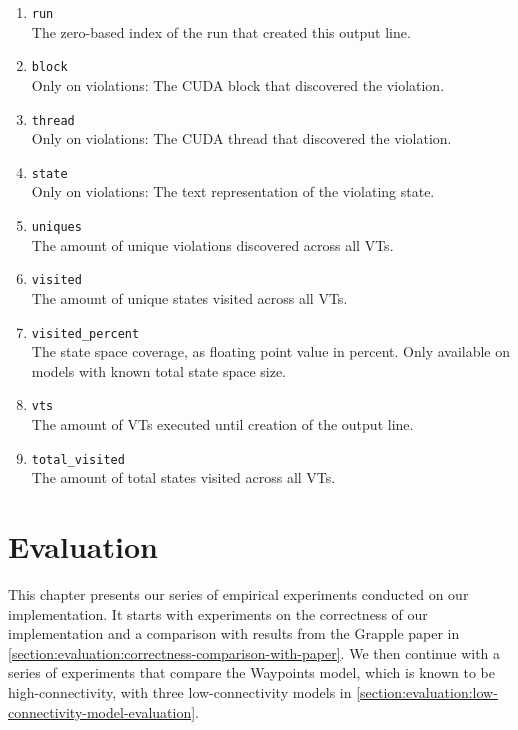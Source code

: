 \documentclass[
fancyheadings, %
%
%
]{stsreprt}
\begin{document}
\begin{enumerate}
    \item \texttt{run} \\
          The zero-based index of the run that created this output line.
    \item \texttt{block} \\
          Only on violations:
          The CUDA block that discovered the violation.
    \item \texttt{thread} \\
          Only on violations:
          The CUDA thread that discovered the violation.
    \item \texttt{state} \\
          Only on violations:
          The text representation of the violating state.
    \item \texttt{uniques} \\
          The amount of unique violations discovered across all VTs.
    \item \texttt{visited} \\
          The amount of unique states visited across all VTs.
    \item \texttt{visited\_percent} \\
          The state space coverage, as floating point value in percent.
          Only available on models with known total state space size.
    \item \texttt{vts} \\
          The amount of VTs executed until creation of the output line.
    \item \texttt{total\_visited} \\
          The amount of total states visited across all VTs.
\end{enumerate}

\chapter{Evaluation}
\label{chapter:evaluation}

This chapter presents our series of empirical experiments conducted on our implementation.
It starts with experiments on the correctness of our implementation and a comparison with results from the Grapple paper \cite{DeFrancisco2020.Grapple} in \cref{section:evaluation:correctness-comparison-with-paper}.
We then continue with a series of experiments that compare the Waypoints model, which is known to be high-connectivity, with three low-connectivity models in \cref{section:evaluation:low-connectivity-model-evaluation}.
\end{document}
